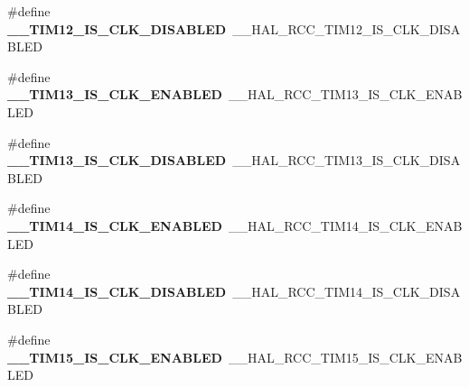 \begin{DoxyCompactItemize}
\item 
\hypertarget{group___h_a_l___r_c_c___aliased_gaaab56663d7cb19bdd60f4e3554b747c7}{\#define {\bfseries \-\_\-\-\_\-\-T\-I\-M12\-\_\-\-I\-S\-\_\-\-C\-L\-K\-\_\-\-D\-I\-S\-A\-B\-L\-E\-D}~\-\_\-\-\_\-\-H\-A\-L\-\_\-\-R\-C\-C\-\_\-\-T\-I\-M12\-\_\-\-I\-S\-\_\-\-C\-L\-K\-\_\-\-D\-I\-S\-A\-B\-L\-E\-D}\label{group___h_a_l___r_c_c___aliased_gaaab56663d7cb19bdd60f4e3554b747c7}

\item 
\hypertarget{group___h_a_l___r_c_c___aliased_ga8188c745262e4d7a49becae198d81bc0}{\#define {\bfseries \-\_\-\-\_\-\-T\-I\-M13\-\_\-\-I\-S\-\_\-\-C\-L\-K\-\_\-\-E\-N\-A\-B\-L\-E\-D}~\-\_\-\-\_\-\-H\-A\-L\-\_\-\-R\-C\-C\-\_\-\-T\-I\-M13\-\_\-\-I\-S\-\_\-\-C\-L\-K\-\_\-\-E\-N\-A\-B\-L\-E\-D}\label{group___h_a_l___r_c_c___aliased_ga8188c745262e4d7a49becae198d81bc0}

\item 
\hypertarget{group___h_a_l___r_c_c___aliased_ga166d8de45811451c662442f48bcfd5d2}{\#define {\bfseries \-\_\-\-\_\-\-T\-I\-M13\-\_\-\-I\-S\-\_\-\-C\-L\-K\-\_\-\-D\-I\-S\-A\-B\-L\-E\-D}~\-\_\-\-\_\-\-H\-A\-L\-\_\-\-R\-C\-C\-\_\-\-T\-I\-M13\-\_\-\-I\-S\-\_\-\-C\-L\-K\-\_\-\-D\-I\-S\-A\-B\-L\-E\-D}\label{group___h_a_l___r_c_c___aliased_ga166d8de45811451c662442f48bcfd5d2}

\item 
\hypertarget{group___h_a_l___r_c_c___aliased_ga4347652552bdd9de4852bc95885e14ae}{\#define {\bfseries \-\_\-\-\_\-\-T\-I\-M14\-\_\-\-I\-S\-\_\-\-C\-L\-K\-\_\-\-E\-N\-A\-B\-L\-E\-D}~\-\_\-\-\_\-\-H\-A\-L\-\_\-\-R\-C\-C\-\_\-\-T\-I\-M14\-\_\-\-I\-S\-\_\-\-C\-L\-K\-\_\-\-E\-N\-A\-B\-L\-E\-D}\label{group___h_a_l___r_c_c___aliased_ga4347652552bdd9de4852bc95885e14ae}

\item 
\hypertarget{group___h_a_l___r_c_c___aliased_gaeb26f1a267eb972d5bfac74e576b1f64}{\#define {\bfseries \-\_\-\-\_\-\-T\-I\-M14\-\_\-\-I\-S\-\_\-\-C\-L\-K\-\_\-\-D\-I\-S\-A\-B\-L\-E\-D}~\-\_\-\-\_\-\-H\-A\-L\-\_\-\-R\-C\-C\-\_\-\-T\-I\-M14\-\_\-\-I\-S\-\_\-\-C\-L\-K\-\_\-\-D\-I\-S\-A\-B\-L\-E\-D}\label{group___h_a_l___r_c_c___aliased_gaeb26f1a267eb972d5bfac74e576b1f64}

\item 
\hypertarget{group___h_a_l___r_c_c___aliased_ga2e7ecc7a174a07f86b79de885ebb5280}{\#define {\bfseries \-\_\-\-\_\-\-T\-I\-M15\-\_\-\-I\-S\-\_\-\-C\-L\-K\-\_\-\-E\-N\-A\-B\-L\-E\-D}~\-\_\-\-\_\-\-H\-A\-L\-\_\-\-R\-C\-C\-\_\-\-T\-I\-M15\-\_\-\-I\-S\-\_\-\-C\-L\-K\-\_\-\-E\-N\-A\-B\-L\-E\-D}\label{group___h_a_l___r_c_c___aliased_ga2e7ecc7a174a07f86b79de885ebb5280}


\end{DoxyCompactItemize}
